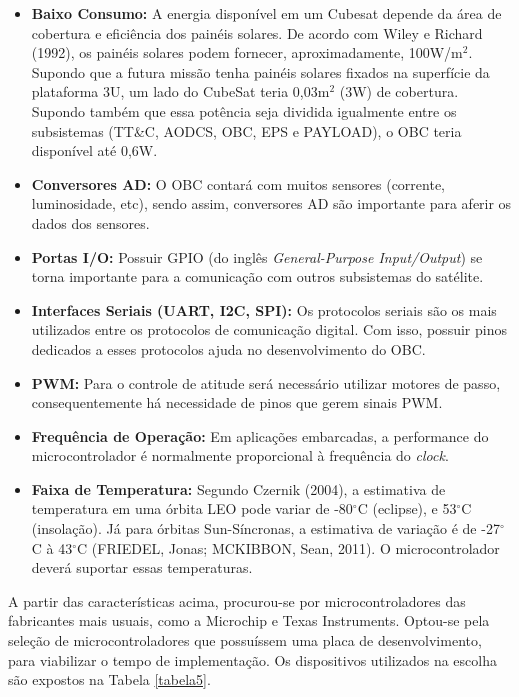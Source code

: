 \begin{itemize}
	\item \textbf{Baixo Consumo:}
	A energia disponível em um Cubesat depende da área de cobertura e eficiência dos painéis solares. De acordo com  Wiley e Richard (1992), os painéis solares podem fornecer, aproximadamente, 100W/m$^2$. Supondo que a futura missão tenha painéis solares fixados na superfície da plataforma 3U, um lado do CubeSat teria 0,03m$^2$ (3W) de cobertura. Supondo também que essa potência seja dividida igualmente entre os subsistemas (TT\&C, AODCS, OBC, EPS e PAYLOAD), o OBC teria disponível até 0,6W.
	
	\item \textbf{Conversores AD:}
	O OBC contará com muitos sensores (corrente, luminosidade, etc), sendo assim, conversores AD são importante para aferir os dados dos sensores. 
	
	\item \textbf{Portas I/O:}
	Possuir GPIO (do inglês \textit{General-Purpose Input/Output}) se torna importante para a comunicação com outros subsistemas do satélite. 
	
	\item \textbf{Interfaces Seriais (UART, I2C, SPI):}
	Os protocolos seriais são os mais utilizados entre os protocolos de comunicação digital. Com isso, possuir pinos dedicados a esses protocolos ajuda no desenvolvimento do OBC.
	
	\item \textbf{PWM:}
	Para o controle de atitude será necessário utilizar motores de passo, consequentemente há necessidade de pinos que gerem sinais PWM.
	
	\item \textbf{Frequência de Operação:}
	Em aplicações embarcadas, a performance do microcontrolador é normalmente proporcional à frequência do \textit{clock}.
	
	\item \textbf{Faixa de Temperatura:}
	Segundo Czernik (2004), a estimativa de temperatura em uma órbita LEO pode variar de -80$^{\circ}$C (eclipse), e 53$^{\circ}$C (insolação). Já para órbitas Sun-Síncronas, a estimativa de variação é de -27$^{\circ}$C à 43$^{\circ}$C (FRIEDEL, Jonas; MCKIBBON, Sean, 2011). O microcontrolador deverá suportar essas temperaturas.
\end{itemize}

A partir das características acima, procurou-se por microcontroladores das fabricantes mais usuais, como a Microchip e Texas Instruments. Optou-se pela seleção de microcontroladores que possuíssem uma placa de desenvolvimento, para viabilizar o tempo de implementação. Os dispositivos utilizados na escolha são expostos na Tabela \ref{tabela5}.

